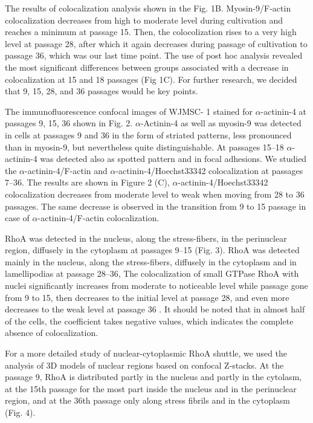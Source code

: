 \documentclass[alpha-refs]{wiley-article}
\begin{document}
The results of colocalization analysis shown in the Fig. 1B.
Myosin-9/F-actin colocalization decreases from high to moderate level during cultivation and reaches a minimum at passage 15.
Then, the colocolization rises to a very high level at passage 28, after which it again decreases during passage of cultivation to passage 36, which was our last time point.
The use of post hoc analysis revealed the most significant differences between groups associated with a decrease in colocalization at 15 and 18 passages (Fig 1C).
For further research, we decided that 9, 15, 28, and 36 passages would be key points.

The immunofluorescence confocal images of WJMSC- 1 stained for $\alpha$-actinin-4 at passages 9, 15, 36 shown in Fig. 2.
$\alpha$-Actinin-4 as well as myosin-9 was detected in cells at passages 9 and 36 in the form of striated patterns, less pronounced than in myosin-9, but nevertheless quite distinguishable.
At passages 15--18 $\alpha$-actinin-4 was detected also as spotted pattern and in focal adhesions.
We studied the $\alpha$-actinin-4/F-actin and $\alpha$-actinin-4/Hoechst33342 colocalization at passages 7--36.
The results are shown in Figure 2 (C), $\alpha$-actinin-4/Hoechst33342 colocalization decreases from moderate level to weak when moving from 28 to 36 passages.
The same decrease is observed in the transition from 9 to 15 passage in case of $\alpha$-actinin-4/F-actin colocalization.

RhoA was detected in the nucleus, along the stress-fibers, in the perinuclear region, diffusely in the cytoplasm at passages 9--15 (Fig. 3).
RhoA was detected mainly in the nucleus, along the stress-fibers, diffusely in the cytoplasm and in lamellipodias at passage  28--36,
The colocalization of small GTPase RhoA with nuclei significantly increases from moderate to noticeable level while passage gone from 9 to 15, then decreases to the initial level at passage 28, and even more decreases to the weak level at passage 36 .
It should be noted that in almost half of the cells, the coefficient takes negative values, which indicates the complete absence of colocalization.

For a more detailed study of nuclear-cytoplasmic RhoA shuttle, we used the analysis of 3D models of nuclear regions based on confocal Z-stacks.
At the passage 9, RhoA is distributed partly in the nucleus and partly in the cytolasm, at the 15th passage for the most part inside the nucleus and in the perinuclear region, and at the 36th passage only along stress fibrils and in the cytoplasm (Fig. 4).
\end{document}
